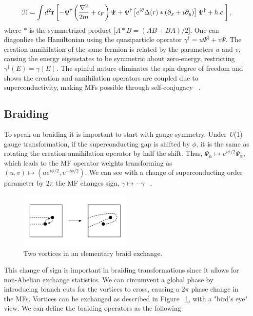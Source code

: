 \begin{equation}
  \mathcal{H} = \int d^2 \mathbf{r} \left[ -\Psi^{\dagger} \left( \dfrac{\nabla^2}{2m} + \epsilon_F \right) \Psi + \Psi^{\dagger} \left[ e^{i\theta} \Delta(r) * \left( \partial_x +i\partial_y \right) \right] \Psi^{\dagger} + h.c. \right],
\end{equation}
where $*$ is the symmetrized product
[$A*B = (AB + BA) / 2$].
One can diagonlize the Hamiltonian using the quasiparticle operator
$\gamma^{\dagger} = u\Psi^{\dagger} + v\Psi$.
The creation annihilation of the same fermion is related by the parameters $u$ and $v$, causing the energy eigenstates to be symmetric about zero-energy, restricting
$\gamma^{\dagger}(E) = \gamma (E)$.
The spinful nature eliminates the spin degree of freedom and shows the creation and annihilation operators are coupled due to superconductivity, making MFs possible through self-conjugacy ~\cite{ivanovNonAbelianStatisticsHalfQuantum2001}.

\subsection{Braiding}
To speak on braiding it is important to start with gauge symmetry.
Under \textit{U}(1) gauge transformation, if the superconducting gap is shifted by $\phi$, it is the same as rotating the creation annihilation operator by half the shift.
Thus, $\Psi_{\alpha} \mapsto e^{i\phi/2} \Psi_{\alpha}$, which leads to the MF operator weights transforming as $(u,v) \mapsto (ue^{i\phi/2}, v^{-i\phi/2})$.
We can see with a change of superconducting order parameter by $2\pi$ the MF changes sign, $\gamma \mapsto -\gamma$ ~\cite{ivanovNonAbelianStatisticsHalfQuantum2001}.

\begin{figure}
  \includegraphics[width=0.5\textwidth]{./figures/pwave-braid.pdf}
  \caption{Two vortices in an elementary braid exchange.}
  \label{fig:pwave-braid}
\end{figure}


This change of sign is important in braiding transformations since it allows for non-Abelian exchange statistics.
We can circumvent a global phase by introducing branch cuts for the vortices to cross, causing a $2\pi$ phase change in the MFs.
Vortices can be exchanged as described in Figure ~\ref{fig:pwave-braid}, with a "bird's eye" view.
We can define the braiding operators as the following

